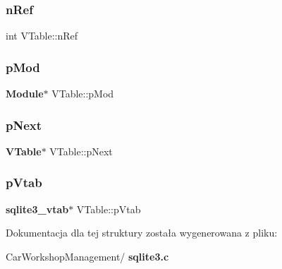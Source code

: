 \mbox{\label{struct_v_table_a12ffe156e5e8e7d19ed029ccfe4ab5dc}} 
\subsubsection{nRef}
{\footnotesize\ttfamily int V\+Table\+::n\+Ref}

\mbox{\label{struct_v_table_ae444452a7168e2f4224a75768abe8312}} 
\subsubsection{pMod}
{\footnotesize\ttfamily \textbf{ Module}$\ast$ V\+Table\+::p\+Mod}

\mbox{\label{struct_v_table_af3cac5e5a38508d0111acb9aa6c5f435}} 
\subsubsection{pNext}
{\footnotesize\ttfamily \textbf{ V\+Table}$\ast$ V\+Table\+::p\+Next}

\mbox{\label{struct_v_table_ae15b9cb002c013019dcbac919bda9ac8}} 
\subsubsection{pVtab}
{\footnotesize\ttfamily \textbf{ sqlite3\+\_\+vtab}$\ast$ V\+Table\+::p\+Vtab}



Dokumentacja dla tej struktury została wygenerowana z pliku\+:\begin{DoxyCompactItemize}
\item 
Car\+Workshop\+Management/\textbf{ sqlite3.\+c}\end{DoxyCompactItemize}

